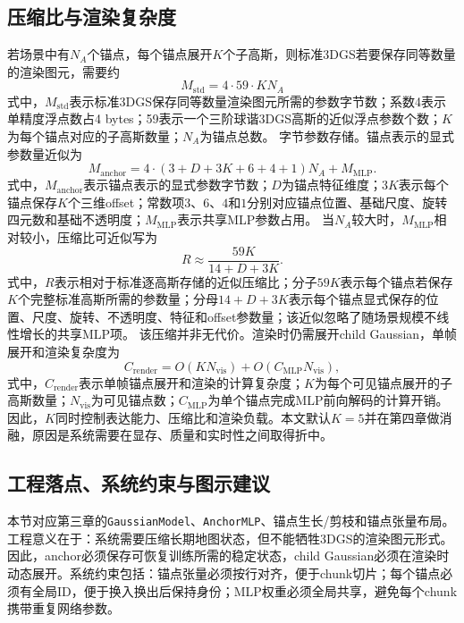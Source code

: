 \subsection{压缩比与渲染复杂度}

若场景中有$N_A$个锚点，每个锚点展开$K$个子高斯，则标准3DGS若要保存同等数量的渲染图元，需要约
\begin{equation}
M_{\mathrm{std}}=4\cdot59\cdot K N_A
\end{equation}
式中，$M_{\mathrm{std}}$表示标准3DGS保存同等数量渲染图元所需的参数字节数；系数4表示单精度浮点数占4 bytes；59表示一个三阶球谐3DGS高斯的近似浮点参数个数；$K$为每个锚点对应的子高斯数量；$N_A$为锚点总数。
字节参数存储。锚点表示的显式参数量近似为
\begin{equation}
M_{\mathrm{anchor}}
=
4\cdot(3+D+3K+6+4+1)N_A
+
M_{\mathrm{MLP}}.
\end{equation}
式中，$M_{\mathrm{anchor}}$表示锚点表示的显式参数字节数；$D$为锚点特征维度；$3K$表示每个锚点保存$K$个三维offset；常数项$3$、$6$、$4$和$1$分别对应锚点位置、基础尺度、旋转四元数和基础不透明度；$M_{\mathrm{MLP}}$表示共享MLP参数占用。
当$N_A$较大时，$M_{\mathrm{MLP}}$相对较小，压缩比可近似写为
\begin{equation}
R\approx
\frac{59K}{14+D+3K}.
\end{equation}
式中，$R$表示相对于标准逐高斯存储的近似压缩比；分子$59K$表示每个锚点若保存$K$个完整标准高斯所需的参数量；分母$14+D+3K$表示每个锚点显式保存的位置、尺度、旋转、不透明度、特征和offset参数量；该近似忽略了随场景规模不线性增长的共享MLP项。
该压缩并非无代价。渲染时仍需展开child Gaussian，单帧展开和渲染复杂度为
\begin{equation}
C_{\mathrm{render}}=O(KN_{\mathrm{vis}})+O(C_{\mathrm{MLP}}N_{\mathrm{vis}}),
\end{equation}
式中，$C_{\mathrm{render}}$表示单帧锚点展开和渲染的计算复杂度；$K$为每个可见锚点展开的子高斯数量；$N_{\mathrm{vis}}$为可见锚点数；$C_{\mathrm{MLP}}$为单个锚点完成MLP前向解码的计算开销。因此，$K$同时控制表达能力、压缩比和渲染负载。本文默认$K=5$并在第四章做消融，原因是系统需要在显存、质量和实时性之间取得折中。

\subsection{工程落点、系统约束与图示建议}

本节对应第三章的\texttt{GaussianModel}、\texttt{AnchorMLP}、锚点生长/剪枝和锚点张量布局。工程意义在于：系统需要压缩长期地图状态，但不能牺牲3DGS的渲染图元形式。因此，anchor必须保存可恢复训练所需的稳定状态，child Gaussian必须在渲染时动态展开。系统约束包括：锚点张量必须按行对齐，便于chunk切片；每个锚点必须有全局ID，便于换入换出后保持身份；MLP权重必须全局共享，避免每个chunk携带重复网络参数。

